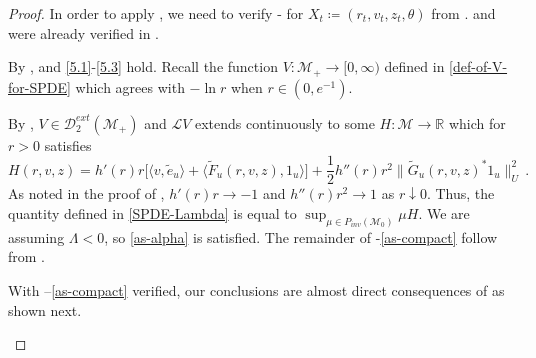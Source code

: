 \documentclass[final]{amsart}
\numberwithin{thm}{section}
\numberwithin{equation}{section}
\newcommand{\mcM}{\mathcal{M}}
\newcommand{\R}{\mathbb{R}}
\newcommand{\inv}{\mathcal{M}_+}
\newcommand{\Dme}{\mathcal{D}^{ext}}
\newcommand{\Ll}{\mathcal{L}}
\newcommand{\ip}[2]{\langle #1, #2 \rangle}
\begin{document}
\begin{proof}
    In order to apply , we need to verify - for $X_t \coloneqq (r_t,v_t,z_t,\theta)$ from .  and  were already verified in .
    
    By ,  and \ref{5.1}-\ref{5.3} hold. Recall the function $V: \inv \to [0,\infty)$ defined in \eqref{def-of-V-for-SPDE} which agrees with $-\ln{r}$ when $r \in (0,e^{-1})$. 
    
    By , $V \in \Dme_2(\inv)$ and $\Ll V$ extends continuously to some $H: \mcM \to \R$ which for $r > 0$ satisfies
    $$
    H(r,v,z) = h'(r)r\Big[\ip{v}{\tilde e_u} + \ip{\tilde F_u(r,v,z)}{1_u}\Big] + \frac{1}{2}h''(r)r^2\|\tilde G_u(r,v,z)^*1_u\|_U^2 \,.
    $$
     As noted in the proof of , $h'(r)r \to -1$ and $h''(r)r^2 \to 1$ as $r \downarrow 0$. Thus, the quantity defined in \eqref{SPDE-Lambda} is equal to $\sup_{\mu \in P_{inv}(\mcM_0)} \mu H$. We are assuming $\Lambda < 0$, so \ref{as-alpha} is satisfied. The remainder of -\ref{as-compact} follow from .
    



    With --\ref{as-compact} verified, our conclusions are almost direct consequences of  as shown next.
    
    \begin{itemize}
    

\end{itemize}
\end{proof}
\end{document}
